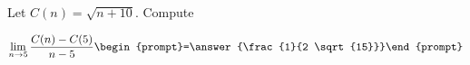\documentclass{ximera}
\author{Bart Snapp}
\begin{document}
\begin{exercise}
Let $C(n) = \sqrt{n+10}$. Compute

\[
\lim_{ n\to 5 } 
\frac{C(n)-C(5)}{n-5} \begin{prompt}=\answer{\frac{1}{2 \sqrt{15}}}\end{prompt}
\]
\end{exercise}
\end{document}

